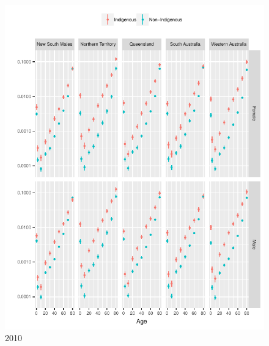 \documentclass{article}
\begin{document}
\begin{figure}
  \centering
  \includegraphics{out/fig_rates_modelled_2010_Baseline}
  \caption{2010}
\end{figure}
\newpage
\end{document}
